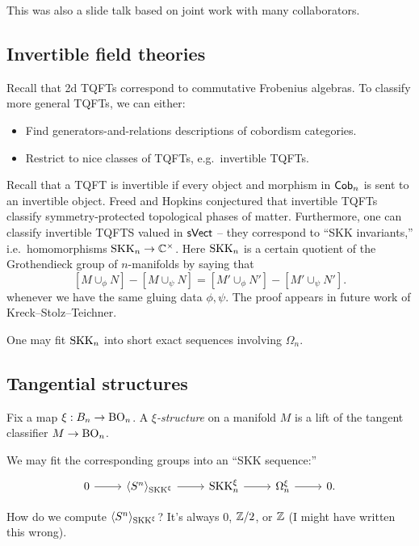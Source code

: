\documentclass{amsart}
\begin{document}
This was also a slide talk based on joint work with many collaborators.

\subsection{Invertible field theories}

Recall that 2d TQFTs correspond to commutative Frobenius algebras.
To classify more general TQFTs, we can either:
\begin{itemize}
  \item Find generators-and-relations descriptions of cobordism categories.
  \item Restrict to nice classes of TQFTs, e.g.\ invertible TQFTs.
\end{itemize}

Recall that a TQFT is invertible if every object and morphism in $\mathsf{Cob}_n$ is sent to an invertible object.
Freed and Hopkins conjectured that invertible TQFTs classify symmetry-protected topological phases of matter.
Furthermore, one can classify invertible TQFTS valued in $\mathsf{sVect}$ -- they correspond to ``SKK invariants,'' i.e.\ homomorphisms $\mathrm{SKK}_n \to \mathbb{C}^\times$.
Here $\mathrm{SKK}_n$ is a certain quotient of the Grothendieck group of $n$-manifolds by saying that 
\[
  [M \cup_\phi N] - [M \cup_\psi N] = [M' \cup_\phi N'] - [M' \cup_\psi N'].
\]
whenever we have the same gluing data $\phi, \psi$.
The proof appears in future work of Kreck--Stolz--Teichner.

One may fit $\mathrm{SKK}_n$ into short exact sequences involving $\Omega_n$.

\subsection{Tangential structures}

\begin{dfn}
  Fix a map $\xi: B_n \to \mathrm{BO}_n$.
  A \emph{$\xi$-structure} on a manifold $M$ is a lift of the tangent classifier $M \to \mathrm{BO}_n$.
\end{dfn}

We may fit the corresponding groups into an ``SKK sequence:''
\[
  \begin{tikzcd}
    0 \rar & \angles{S^n}_{\SKK^\xi} \rar & \SKK^\xi_n \rar & \Omega^\xi_n \rar & 0.
  \end{tikzcd}
\]

\begin{qn}
  How do we compute $\langle S^n\rangle_{\mathrm{SKK}^\xi}$?
  It's always $0$, $\mathbb{Z}/2$, or $\mathbb{Z}$ (I might have written this wrong).
\end{qn}
\end{document}
